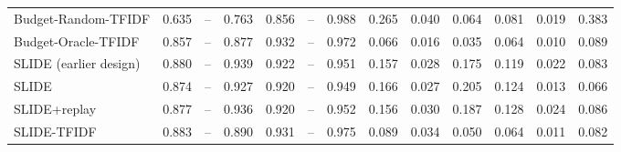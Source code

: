 \begin{table}[t]
{\begin{tabular}{@{}lcccccccccccc@{}}
Budget-Random-TFIDF & 0.635 & -- & 0.763 & 0.856 & -- & 0.988 & 0.265 & 0.040 & 0.064 & 0.081 & 0.019 & 0.383 \\
Budget-Oracle-TFIDF & 0.857 & -- & 0.877 & 0.932 & -- & 0.972 & 0.066 & 0.016 & 0.035 & 0.064 & 0.010 & 0.089 \\
SLIDE (earlier design) & 0.880 & -- & 0.939 & 0.922 & -- & 0.951 & 0.157 & 0.028 & 0.175 & 0.119 & 0.022 & 0.083 \\
SLIDE & 0.874 & -- & 0.927 & 0.920 & -- & 0.949 & 0.166 & 0.027 & 0.205 & 0.124 & 0.013 & 0.066 \\
SLIDE+replay & 0.877 & -- & 0.936 & 0.920 & -- & 0.952 & 0.156 & 0.030 & 0.187 & 0.128 & 0.024 & 0.086 \\
SLIDE-TFIDF & 0.883 & -- & 0.890 & 0.931 & -- & 0.975 & 0.089 & 0.034 & 0.050 & 0.064 & 0.011 & 0.082 \\
\bottomrule
\end{tabular}}
\end{table}
